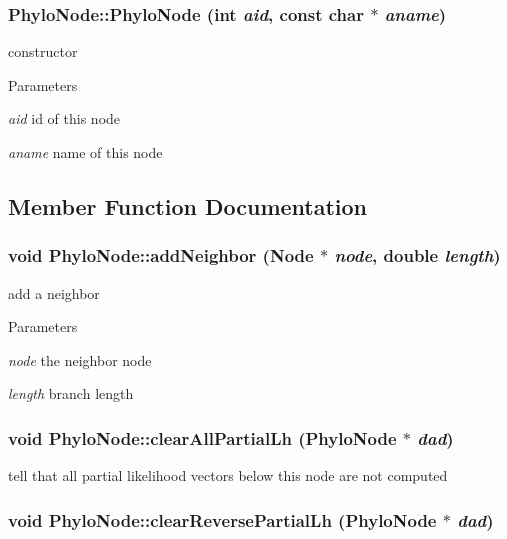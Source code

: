 \hypertarget{classPhyloNode_aa0ef98742403e238c9ee2789cc9d4a51}{
\subsubsection[{PhyloNode}]{\setlength{\rightskip}{0pt plus 5cm}PhyloNode::PhyloNode (int {\em aid}, \/  const char $\ast$ {\em aname})}}
\label{classPhyloNode_aa0ef98742403e238c9ee2789cc9d4a51}
constructor 
\begin{DoxyParams}{Parameters}
\item[{\em aid}]id of this node \item[{\em aname}]name of this node \end{DoxyParams}


\subsection{Member Function Documentation}
\hypertarget{classPhyloNode_a626f3e6259921ebf7769dcb19858c825}{
\subsubsection[{addNeighbor}]{\setlength{\rightskip}{0pt plus 5cm}void PhyloNode::addNeighbor ({\bf Node} $\ast$ {\em node}, \/  double {\em length})}}
\label{classPhyloNode_a626f3e6259921ebf7769dcb19858c825}
add a neighbor 
\begin{DoxyParams}{Parameters}
\item[{\em node}]the neighbor node \item[{\em length}]branch length \end{DoxyParams}
\hypertarget{classPhyloNode_a70a516028a492af1eb1a5108d04cbc5f}{
\subsubsection[{clearAllPartialLh}]{\setlength{\rightskip}{0pt plus 5cm}void PhyloNode::clearAllPartialLh ({\bf PhyloNode} $\ast$ {\em dad})}}
\label{classPhyloNode_a70a516028a492af1eb1a5108d04cbc5f}
tell that all partial likelihood vectors below this node are not computed \hypertarget{classPhyloNode_ad752a7a4155b10d7b46d1f92afa9acc5}{
\subsubsection[{clearReversePartialLh}]{\setlength{\rightskip}{0pt plus 5cm}void PhyloNode::clearReversePartialLh ({\bf PhyloNode} $\ast$ {\em dad})}}
